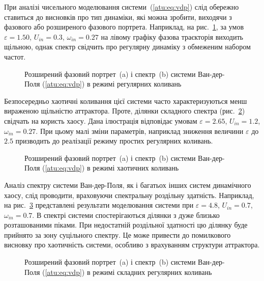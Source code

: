 При аналізі чисельного моделювання системи~(\ref{atu:eq:vdp})
слід обережно ставиться до висновків про тип динаміки, які
можна зробити, виходячи з фазового або розширеного фазового
портрета.
Наприклад, на рис.~\ref{atu:f:vdp_phase_f_reg}, за умов
$ \varepsilon = 1.50 $,
$ U_{in} = 0.3 $,
$ \omega_{in} = 0.27 $ на лівому графіку фазова траєкторія виходить
щільною, однак спектр свідчить про регулярну динаміку з
обмеженим набором частот.

\begin{figure}[ht!]
  \caption{Розширений фазовий портрет~(a) і спектр~(b) системи Ван-дер-Поля (\ref{atu:eq:vdp}) в режимі регулярних коливань}
\label{atu:f:vdp_phase_f_reg}
\end{figure}

Безпосередньо хаотичні коливання цієї системи часто
характеризуються менш вираженою щільністю аттрактора. Проте,
ділянки складного спектра (рис.~\ref{atu:f:vdp_phase_f_chaos}) свідчать на
користь хаосу. Дана ілюстрація відповідає умовам
$ \varepsilon = 2.65 $,
$ U_{in} = 1.2 $,
$ \omega_{in} = 0.27 $. При цьому малі зміни параметрів, наприклад зниження
величини
$ \varepsilon $ до
$ 2.5 $ призводить до реалізації режиму простих регулярних
коливань.

\begin{figure}[ht!]
  \caption{Розширений фазовий портрет~(a) і спектр~(b) системи Ван-дер-Поля (\ref{atu:eq:vdp}) в режимі хаотичних коливань}
\label{atu:f:vdp_phase_f_chaos}
\end{figure}

Аналіз спектру системи Ван-дер-Поля, як і багатьох інших систем
динамічного хаосу, слід проводити, враховуючи спектральну
роздільну здатність. Наприклад, на рис.~\ref{atu:f:vdp_phase_f_complex} представлені
результати моделювання системи при
$ \varepsilon = 4.8 $,
$ U_{in} = 0.7 $,
$ \omega_{in} = 0.7 $. В спектрі системи спостерігаються ділянки з дуже
близько розташованими піками. При недостатній роздільної
здатності цю ділянку буде прийнято за зону суцільного
спектру. Це може привести до помилкового висновку про хаотичність системи,
особливо з врахуванням структури аттрактора.

\begin{figure}[ht!]
  \caption{Розширений фазовий портрет~(a) і спектр~(b) системи Ван-дер-Поля (\ref{atu:eq:vdp}) в режимі складних регулярних коливань}
\label{atu:f:vdp_phase_f_complex}
\end{figure}


